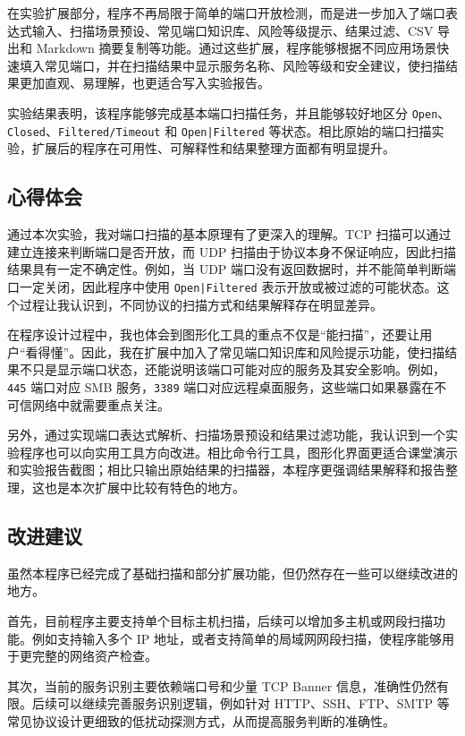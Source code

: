 \documentclass[UTF8,a4paper,12pt]{ctexart}
\begin{document}
在实验扩展部分，程序不再局限于简单的端口开放检测，而是进一步加入了端口表达式输入、扫描场景预设、常见端口知识库、风险等级提示、结果过滤、CSV 导出和 Markdown 摘要复制等功能。通过这些扩展，程序能够根据不同应用场景快速填入常见端口，并在扫描结果中显示服务名称、风险等级和安全建议，使扫描结果更加直观、易理解，也更适合写入实验报告。

实验结果表明，该程序能够完成基本端口扫描任务，并且能够较好地区分 \texttt{Open}、\texttt{Closed}、\texttt{Filtered/Timeout} 和 \texttt{Open|Filtered} 等状态。相比原始的端口扫描实验，扩展后的程序在可用性、可解释性和结果整理方面都有明显提升。

\subsection{心得体会}

通过本次实验，我对端口扫描的基本原理有了更深入的理解。TCP 扫描可以通过建立连接来判断端口是否开放，而 UDP 扫描由于协议本身不保证响应，因此扫描结果具有一定不确定性。例如，当 UDP 端口没有返回数据时，并不能简单判断端口一定关闭，因此程序中使用 \texttt{Open|Filtered} 表示开放或被过滤的可能状态。这个过程让我认识到，不同协议的扫描方式和结果解释存在明显差异。

在程序设计过程中，我也体会到图形化工具的重点不仅是“能扫描”，还要让用户“看得懂”。因此，我在扩展中加入了常见端口知识库和风险提示功能，使扫描结果不只是显示端口状态，还能说明该端口可能对应的服务及其安全影响。例如，\texttt{445} 端口对应 SMB 服务，\texttt{3389} 端口对应远程桌面服务，这些端口如果暴露在不可信网络中就需要重点关注。

另外，通过实现端口表达式解析、扫描场景预设和结果过滤功能，我认识到一个实验程序也可以向实用工具方向改进。相比命令行工具，图形化界面更适合课堂演示和实验报告截图；相比只输出原始结果的扫描器，本程序更强调结果解释和报告整理，这也是本次扩展中比较有特色的地方。

\subsection{改进建议}

虽然本程序已经完成了基础扫描和部分扩展功能，但仍然存在一些可以继续改进的地方。

首先，目前程序主要支持单个目标主机扫描，后续可以增加多主机或网段扫描功能。例如支持输入多个 IP 地址，或者支持简单的局域网网段扫描，使程序能够用于更完整的网络资产检查。

其次，当前的服务识别主要依赖端口号和少量 TCP Banner 信息，准确性仍然有限。后续可以继续完善服务识别逻辑，例如针对 HTTP、SSH、FTP、SMTP 等常见协议设计更细致的低扰动探测方式，从而提高服务判断的准确性。
\end{document}
